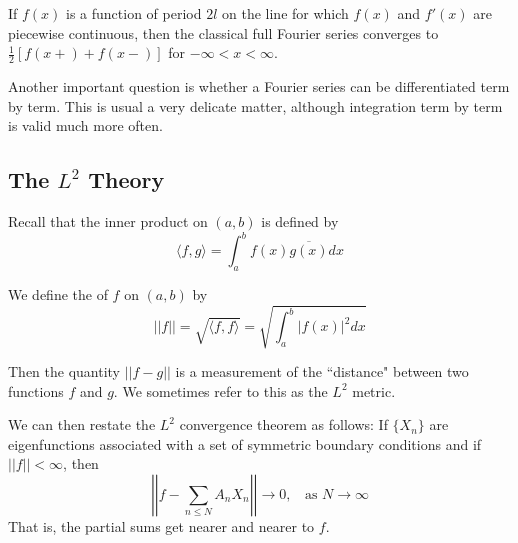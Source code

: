 \begin{theorem}
    If $f(x)$ is a function of period $2l$ on the line for which $f(x)$ and $f'(x)$ are piecewise continuous, then the classical full Fourier series converges to $\frac{1}{2}[f(x+)+f(x-)]$ for $-\infty < x < \infty$.
\end{theorem}

Another important question is whether a Fourier series can be differentiated term by term. This is usual a very delicate matter, although integration term by term is valid much more often.

\subsection{The \texorpdfstring{$L^2$}{L2} Theory}

Recall that the inner product on $(a,b)$ is defined by \begin{equation*}
    \langle f, g\rangle = \int_a^bf(x)\overline{g(x)}dx
\end{equation*}

\begin{definition}
    We define the  of $f$ on $(a,b)$ by \begin{equation*}
        ||f|| = \sqrt{\langle f,f\rangle} = \sqrt{\int_a^b|f(x)|^2dx}
    \end{equation*}
\end{definition}

Then the quantity $||f-g||$ is a measurement of the ``distance" between two functions $f$ and $g$. We sometimes refer to this as the $L^2$ metric. 

We can then restate the $L^2$ convergence theorem as follows: If $\{X_n\}$ are eigenfunctions associated with a set of symmetric boundary conditions and if $||f|| < \infty$, then \begin{equation}
    \left|\left|f - \sum_{n\leq N}A_nX_n\right|\right|\rightarrow 0,\;\;\text{ as }N\rightarrow \infty
\end{equation}
That is, the partial sums get nearer and nearer to $f$.

